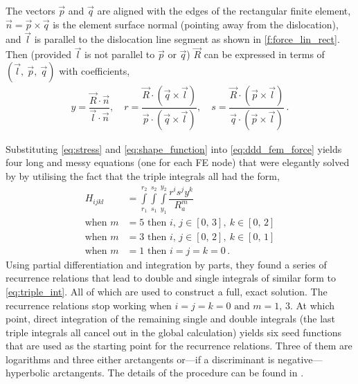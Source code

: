The vectors $\vec{p}$ and $\vec{q}$ are aligned with the edges of the rectangular finite element, $\vec{n} = \vec{p} \times \vec{q}$ is the element surface normal (pointing away from the dislocation), and $\vec{l}$ is parallel to the dislocation line segment as shown in \cref{f:force_lin_rect}. Then (provided $\vec{l}$ is not parallel to $\vec{p}$ or $\vec{q}$) $\vec{R}$ can be expressed in terms of $(\vec{l},~\vec{p},~\vec{q})$ with coefficients,
\begin{align}
  y = \dfrac{\vec{R}\cdot \vec{n}}{\vec{l}\cdot \vec{n}} \label{eq:problem},\quad
  r = \dfrac{\vec{R}\cdot (\vec{q} \times \vec{l})}{\vec{p}\cdot (\vec{q} \times \vec{l})}, \quad
  s = \dfrac{\vec{R}\cdot (\vec{p} \times \vec{l})}{\vec{q}\cdot (\vec{p} \times \vec{l})}\,.
\end{align}

Substituting \cref{eq:stress} and \cref{eq:shape_function} into \cref{eq:ddd_fem_force} yields four long and messy equations (one for each FE node) that were elegantly solved by \citet{analytic_tractions} by utilising the fact that the triple integrals all had the form,
\begin{align}
  H_{ijkl}        & = \int\limits_{r_{1}}^{r_{2}}\int\limits_{s_{1}}^{s_{2}}\int\limits_{y_{1}}^{y_{2}} \dfrac{r^i s^j y^k}{R_{a}^{m}}\label{eq:triple_int} \\
  \textrm{when }m & = 5 \textrm{ then } i,\, j \in [0,\,3],~k \in [0,\,2]\nonumber                                                                          \\
  \textrm{when }m & = 3 \textrm{ then } i,\, j \in [0,\,2],~k \in [0,\,1]\nonumber                                                                          \\
  \textrm{when }m & = 1 \textrm{ then } i = j = k = 0\,.
\end{align}
Using partial differentiation and integration by parts, they found a series of recurrence relations that lead to double and single integrals of similar form to \cref{eq:triple_int}. All of which are used to construct a full, exact solution. The recurrence relations stop working when $i = j = k = 0 \textrm{ and } m = 1,\, 3$. At which point, direct integration of the remaining single and double integrals (the last triple integrals all cancel out in the global calculation) yields six seed functions that are used as the starting point for the recurrence relations. Three of them are logarithms and three either arctangents or---if a discriminant is negative---hyperbolic arctangents. The details of the procedure can be found in \cite{analytic_tractions}.

